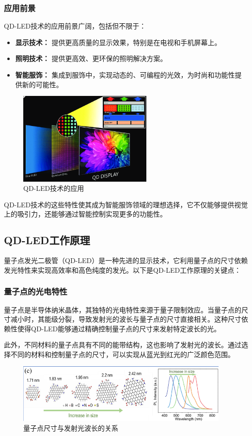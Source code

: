 \documentclass[12pt,hyperref,a4paper,UTF8]{ctexart}
\begin{document}
\subsubsection*{应用前景}
QD-LED技术的应用前景广阔，包括但不限于：
\begin{itemize}
  \item \textbf{显示技术：} 提供更高质量的显示效果，特别是在电视和手机屏幕上。
  \item \textbf{照明技术：} 提供更高效、更环保的照明解决方案。
  \item \textbf{智能服饰：} 集成到服饰中，实现动态的、可编程的光效，为时尚和功能性提供新的可能性。
\end{itemize}
\begin{figure}[H]
    \centering
    \includegraphics[width=0.6\textwidth]{figures/fig/image3.png}
    \caption{QD-LED技术的应用}
\end{figure}

QD-LED技术的这些特性使其成为智能服饰领域的理想选择，它不仅能够提供视觉上的吸引力，还能够通过智能控制实现更多的功能性。






\subsection{QD-LED工作原理}
量子点发光二极管（QD-LED）是一种先进的显示技术，它利用量子点的尺寸依赖发光特性来实现高效率和高色纯度的发光。以下是QD-LED工作原理的关键点：

\subsubsection*{量子点的光电特性}
量子点是半导体纳米晶体，其独特的光电特性来源于量子限制效应。当量子点的尺寸减小时，其能级分裂，导致发射光的波长与量子点的尺寸直接相关。这种尺寸依赖性使得QD-LED能够通过精确控制量子点的尺寸来发射特定波长的光。

此外，不同材料的量子点具有不同的能带结构，这也影响了发射光的波长。通过选择不同的材料和控制量子点的尺寸，可以实现从蓝光到红光的广泛颜色范围\cite{qin2024structurally}。
\begin{figure}[H]
  \centering
  \includegraphics[width=0.95\textwidth]{figures/fig/image5.png} 
  \caption{量子点尺寸与发射光波长的关系}
\end{figure}
\end{document}
